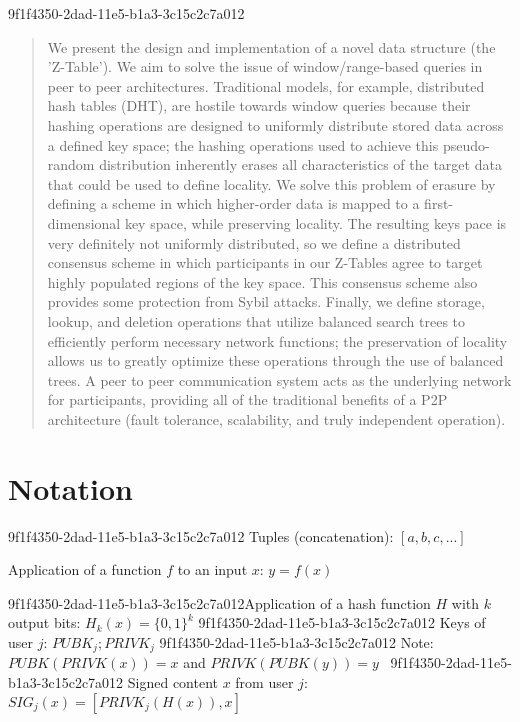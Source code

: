 \documentclass[12pt]{article}
\begin{document}
9f1f4350-2dad-11e5-b1a3-3c15c2c7a012\maketitle

\begin{abstract}
We present the design and implementation of a novel data structure (the 'Z-Table'). We aim to solve the issue of window/range-based queries in peer to peer architectures. Traditional models, for example,  distributed hash tables (DHT), are hostile towards window queries because their hashing operations are designed to uniformly distribute stored data across a defined key space; the hashing operations used to achieve this pseudo-random distribution inherently erases all characteristics of the target data that could be used to define locality. We solve this problem of erasure by defining a scheme in which higher-order data is mapped to a first-dimensional key space, while preserving locality. The resulting keys pace is very definitely not uniformly distributed, so we define a distributed consensus scheme in which participants in our Z-Tables agree to target highly populated regions of the key space. This consensus scheme also provides some protection from Sybil attacks. Finally, we define storage, lookup, and deletion operations that utilize balanced search trees to efficiently perform necessary network functions; the preservation of locality allows us to greatly optimize these operations through the use of balanced trees. A peer to peer communication system acts as the underlying network for participants, providing all of the traditional benefits of a P2P architecture (fault tolerance, scalability, and truly independent operation).
\end{abstract}

\section{Notation}
9f1f4350-2dad-11e5-b1a3-3c15c2c7a012
Tuples (concatenation): $[a,b,c,...]$

Application of a function $f$ to an input $x$: $y=f(x)$

9f1f4350-2dad-11e5-b1a3-3c15c2c7a012Application of a hash function $H$ with $k$ output bits: $H_{k}(x) = \{0,1\}^k$
9f1f4350-2dad-11e5-b1a3-3c15c2c7a012
Keys of user $j$: $ PUBK_j; PRIVK_j $
9f1f4350-2dad-11e5-b1a3-3c15c2c7a012
Note: $PUBK(PRIVK(x)) = x$ and $PRIVK(PUBK(y)) = y$~
9f1f4350-2dad-11e5-b1a3-3c15c2c7a012
Signed content $x$ from user $j$: $SIG_j(x) = \left[ PRIVK_j( H(x) ), x \right]$
\end{document}
